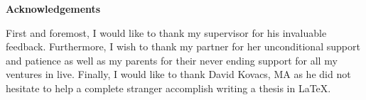 
\begin{sffamily}
	{\noindent\fontsize{18pt}{21.6pt}\textbf{Acknowledgements}}
	\newline

	\noindent
	First and foremost, I would like to thank my supervisor \advisor for his invaluable feedback.
	Furthermore, I wish to thank my partner for her unconditional support and patience as well as my parents for their never ending support for all my ventures in live.
	Finally, I would like to thank David Kovacs, MA as he did not hesitate to help a complete stranger accomplish writing a thesis in LaTeX.

\end{sffamily}
\clearpage
